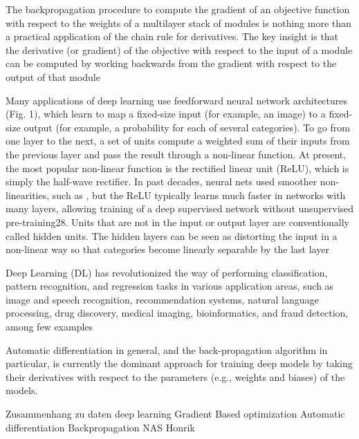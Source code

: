 The backpropagation procedure to compute the gradient of an objective function with respect to the weights of a multilayer stack of modules is nothing more than a practical application of the chain rule for derivatives. The key insight is that the derivative (or gradient) of the objective with respect to the input of a module can be computed by working backwards from the gradient with respect to the output of that module

Many applications of deep learning use feedforward neural network architectures (Fig. 1), which learn to map a fixed-size input (for example, an image) to a fixed-size output (for example, a probability for each of several categories). To go from one layer to the next, a set of units compute a weighted sum of their inputs from the previous layer and pass the result through a non-linear function. At present, the most popular non-linear function is the rectified linear unit (ReLU), which is simply the half-wave rectifier. In past decades, neural nets used smoother non-linearities, such as , but the ReLU typically learns much faster in networks with many layers, allowing training of a deep supervised network without unsupervised pre-training28. Units that are not in the input or output layer are conventionally called hidden units. The hidden layers can be seen as distorting the input in a non-linear way so that categories become linearly separable by the last layer 

Deep Learning (DL) has revolutionized the way of performing classification, pattern recognition, and regression
tasks in various application areas, such as image and speech recognition, recommendation systems, natural language
processing, drug discovery, medical imaging, bioinformatics, and fraud detection, among few examples

Automatic differentiation in general, and the back-propagation algorithm in particular, is currently the dominant approach for training deep models by taking their derivatives with respect to the parameters (e.g., weights and biases) of the models.


Zusammenhang zu daten
deep learning
Gradient Based optimization
Automatic differentiation
Backpropagation 
NAS
Honrik 